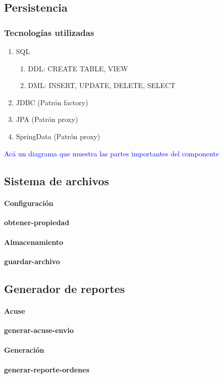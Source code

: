 \subsection{Persistencia}
\subsubsection{Tecnologías utilizadas}
\begin{enumerate}
	\item SQL 
		\begin{enumerate}
			\item DDL: CREATE TABLE, VIEW
			\item DML: INSERT, UPDATE, DELETE, SELECT
		\end{enumerate}
	\item JDBC 			(Patrón factory)
	\item JPA			(Patrón proxy)
	\item SpringData	(Patrón proxy)
\end{enumerate}

\textcolor{blue}{
	Acá un diagrama que muestra las partes importantes del componente
}

\subsection{Sistema de archivos}
	\paragraph{Configuración\\}
		\textbf{obtener-propiedad}
	\paragraph{Almacenamiento\\}
		\textbf{guardar-archivo}
\subsection{Generador de reportes}
	\paragraph{Acuse\\}
		\textbf{generar-acuse-envio}
	\paragraph{Generación\\}
 		\textbf{generar-reporte-ordenes}
